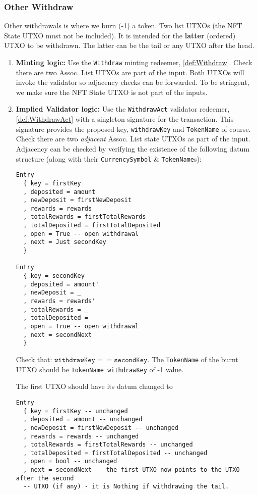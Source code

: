 \documentclass[10pt, a4paper]{article}
\theoremstyle{definition}
\begin{document}
\subsubsection{Other Withdraw}\label{subsubsection:OtherWithdraw}
Other withdrawals is where we burn (-1) a token. Two list UTXOs (the NFT State UTXO must not be included). It is intended for the \textbf{latter} (ordered) UTXO to be withdrawn. The latter can be the tail or any UTXO after the head.
\begin{enumerate}
\item{\textbf{Minting logic:} Use the \texttt{Withdraw} minting redeemer, \ref{def:Withdraw}. Check there are two Assoc. List UTXOs are part of the input. Both UTXOs will invoke the validator so adjacency checks can be forwarded. To be stringent, we make sure the NFT State UTXO is not part of the inputs.
}

\item{\textbf{Implied Validator logic:} Use the \texttt{WithdrawAct} validator redeemer, \ref{def:WithdrawAct} with a singleton signature for the transaction. This signature provides the proposed key, \texttt{withdrawKey} and \texttt{TokenName} of course. Check there are two \textit{adjacent} Assoc. List state UTXOs as part of the input. Adjacency can be checked by verifying the existence of the following datum structure (along with their \texttt{CurrencySymbol} \& \texttt{TokenName}s):
\begin{verbatim}
Entry
  { key = firstKey
  , deposited = amount
  , newDeposit = firstNewDeposit
  , rewards = rewards
  , totalRewards = firstTotalRewards
  , totalDeposited = firstTotalDeposited
  , open = True -- open withdrawal
  , next = Just secondKey
  }
  
Entry
  { key = secondKey
  , deposited = amount'
  , newDeposit = _
  , rewards = rewards'
  , totalRewards = _ 
  , totalDeposited = _
  , open = True -- open withdrawal
  , next = secondNext
  }
\end{verbatim}

Check that: $\texttt{withdrawKey} == \texttt{secondKey}.$ The \texttt{TokenName} of the burnt UTXO should be \texttt{TokenName withdrawKey} of -1 value.

The first UTXO should have its datum changed to \begin{verbatim}
Entry
  { key = firstKey -- unchanged
  , deposited = amount -- unchanged
  , newDeposit = firstNewDeposit -- unchanged
  , rewards = rewards -- unchanged
  , totalRewards = firstTotalRewards -- unchanged
  , totalDeposited = firstTotalDeposited -- unchanged
  , open = bool -- unchanged
  , next = secondNext -- the first UTXO now points to the UTXO after the second
  -- UTXO (if any) - it is Nothing if withdrawing the tail.
\end{verbatim}

}
\end{enumerate}
\end{document}
